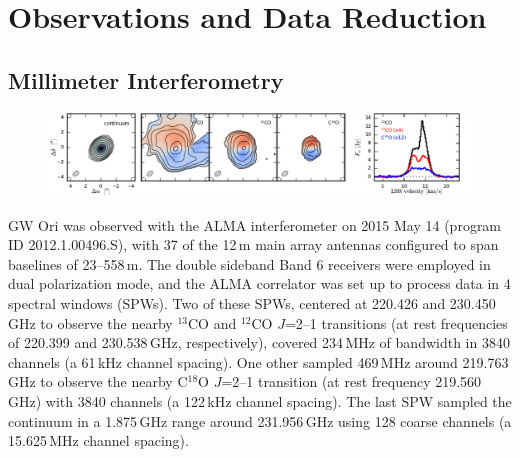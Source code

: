 \documentclass[twocolumn]{aastex61}
\begin{document}
\section{Observations and Data Reduction \label{sec:obs}}


\subsection{Millimeter Interferometry}

\begin{figure}[ht!]
\begin{center}
  \includegraphics[width=\linewidth]{moments.pdf}
  \end{center}
\end{figure}

GW Ori was observed with the ALMA interferometer on 2015 May 14 (program ID 2012.1.00496.S), with 37 of the 12\,m main array antennas configured to span baselines of 23--558\,m.  The double sideband Band 6 receivers were employed in dual polarization mode, and the ALMA correlator was set up to process data in 4 spectral windows (SPWs).  Two of these SPWs, centered at 220.426 and 230.450\,GHz to observe the nearby $^{13}$CO and $^{12}$CO $J$=2--1 transitions (at rest frequencies of 220.399 and 230.538\,GHz, respectively), covered 234\,MHz of bandwidth in 3840 channels (a 61\,kHz channel spacing).  One other sampled 469\,MHz around 219.763\,GHz to observe the nearby C$^{18}$O $J$=2--1 transition (at rest frequency 219.560\,GHz) with 3840 channels (a 122\,kHz channel spacing).  The last SPW sampled the continuum in a 1.875\,GHz range around 231.956\,GHz using 128 coarse channels (a 15.625\,MHz channel spacing).
\end{document}
